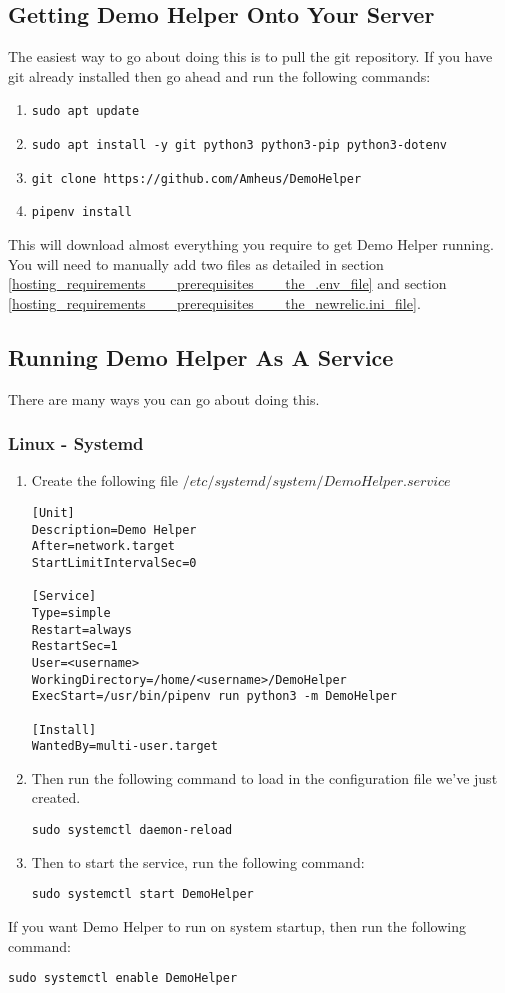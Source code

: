 \pagebreak
\subsection{Getting Demo Helper Onto Your Server}
The easiest way to go about doing this is to pull the git repository.
If you have git already installed then go ahead and run the following commands:
\begin{enumerate}
	\item{\texttt{sudo apt update}}
	\item{\texttt{sudo apt install -y git python3 python3-pip python3-dotenv}}
	\item{\texttt{git clone https://github.com/Amheus/DemoHelper}}
	\item{\texttt{pipenv install}}
\end{enumerate}

This will download almost everything you require to get Demo Helper running.
You will need to manually add two files as detailed in section \ref{hosting_requirements___prerequisites___the_.env_file} and section \ref{hosting_requirements___prerequisites___the_newrelic.ini_file}.


\pagebreak
\subsection{Running Demo Helper As A Service}
There are many ways you can go about doing this.
\subsubsection{Linux - Systemd}
\begin{enumerate}
	\item
	{
		Create the following file $/etc/systemd/system/DemoHelper.service$
		\begin{verbatim}
[Unit]
Description=Demo Helper
After=network.target
StartLimitIntervalSec=0

[Service]
Type=simple
Restart=always
RestartSec=1
User=<username>
WorkingDirectory=/home/<username>/DemoHelper
ExecStart=/usr/bin/pipenv run python3 -m DemoHelper

[Install]
WantedBy=multi-user.target
		\end{verbatim}
	}
	\item
	{
		Then run the following command to load in the configuration file we've just created.
		\begin{verbatim}
sudo systemctl daemon-reload
		\end{verbatim}
	}
	\item
	{
		Then to start the service, run the following command:
		\begin{verbatim}
sudo systemctl start DemoHelper
		\end{verbatim}
	}
\end{enumerate}
If you want Demo Helper to run on system startup, then run the following command:
\begin{verbatim}
sudo systemctl enable DemoHelper
\end{verbatim}

